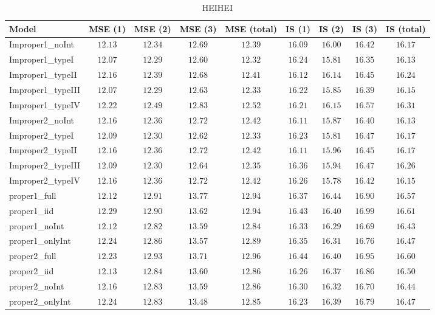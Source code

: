 \begin{table}

\caption{\label{tab:model-choice-sc9}HEIHEI}
\centering
\begin{tabular}{lcccccccc}
\hline
Model  & MSE (1) & MSE (2) & MSE (3) & MSE (total) & IS (1) & IS (2) & IS (3) & \multicolumn{1}{c}{IS (total)} \\ 
\hline
Improper1_noInt  & $12.13$ & $12.34$ & $12.69$ & $12.39$ & $16.09$ & $16.00$ & $16.42$ & $16.17$ \\
Improper1_typeI  & $12.07$ & $12.29$ & $12.60$ & $12.32$ & $16.24$ & $15.81$ & $16.35$ & $16.13$ \\
Improper1_typeII  & $12.16$ & $12.39$ & $12.68$ & $12.41$ & $16.12$ & $16.14$ & $16.45$ & $16.24$ \\
Improper1_typeIII  & $12.07$ & $12.29$ & $12.63$ & $12.33$ & $16.22$ & $15.85$ & $16.39$ & $16.15$ \\
Improper1_typeIV  & $12.22$ & $12.49$ & $12.83$ & $12.52$ & $16.21$ & $16.15$ & $16.57$ & $16.31$ \\
Improper2_noInt  & $12.16$ & $12.36$ & $12.72$ & $12.42$ & $16.11$ & $15.87$ & $16.40$ & $16.13$ \\
Improper2_typeI  & $12.09$ & $12.30$ & $12.62$ & $12.33$ & $16.23$ & $15.81$ & $16.47$ & $16.17$ \\
Improper2_typeII  & $12.16$ & $12.36$ & $12.72$ & $12.42$ & $16.11$ & $15.96$ & $16.45$ & $16.17$ \\
Improper2_typeIII  & $12.09$ & $12.30$ & $12.64$ & $12.35$ & $16.36$ & $15.94$ & $16.47$ & $16.26$ \\
Improper2_typeIV  & $12.16$ & $12.36$ & $12.72$ & $12.42$ & $16.26$ & $15.78$ & $16.42$ & $16.15$ \\
proper1_full  & $12.12$ & $12.91$ & $13.77$ & $12.94$ & $16.37$ & $16.44$ & $16.90$ & $16.57$ \\
proper1_iid  & $12.29$ & $12.90$ & $13.62$ & $12.94$ & $16.43$ & $16.40$ & $16.99$ & $16.61$ \\
proper1_noInt  & $12.12$ & $12.82$ & $13.59$ & $12.84$ & $16.33$ & $16.29$ & $16.69$ & $16.43$ \\
proper1_onlyInt  & $12.24$ & $12.86$ & $13.57$ & $12.89$ & $16.35$ & $16.31$ & $16.76$ & $16.47$ \\
proper2_full  & $12.23$ & $12.93$ & $13.71$ & $12.96$ & $16.44$ & $16.40$ & $16.95$ & $16.60$ \\
proper2_iid  & $12.13$ & $12.84$ & $13.60$ & $12.86$ & $16.26$ & $16.37$ & $16.86$ & $16.50$ \\
proper2_noInt  & $12.16$ & $12.83$ & $13.59$ & $12.86$ & $16.30$ & $16.32$ & $16.70$ & $16.44$ \\
proper2_onlyInt  & $12.24$ & $12.83$ & $13.48$ & $12.85$ & $16.23$ & $16.39$ & $16.79$ & $16.47$ \\
\hline 
\end{tabular}

\end{table}